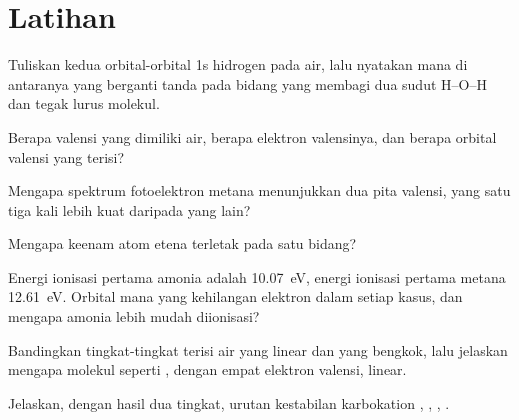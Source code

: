 \section{Latihan}

\begin{exercise}[$\star$]\label{exo:b2:fragment-orbitals:1}
Tuliskan kedua  orbital-orbital 1s hidrogen
pada air, lalu nyatakan mana di antaranya yang berganti tanda pada bidang
yang membagi dua sudut H--O--H dan tegak lurus molekul.
\end{exercise}

\begin{exercise}[$\star$]\label{exo:b2:fragment-orbitals:2}
Berapa  valensi yang dimiliki air, berapa elektron
valensinya, dan berapa orbital valensi yang terisi?
\end{exercise}

\begin{exercise}[$\star$]\label{exo:b2:fragment-orbitals:3}
Mengapa spektrum fotoelektron metana menunjukkan dua pita valensi, yang
satu tiga kali lebih kuat daripada yang lain?
\end{exercise}

\begin{exercise}[$\star$]\label{exo:b2:fragment-orbitals:4}
Mengapa keenam atom etena terletak pada satu bidang?
\end{exercise}

\begin{exercise}[$\star\star$]\label{exo:b2:fragment-orbitals:5}
Energi ionisasi pertama amonia adalah \qty{10.07}{eV}, energi ionisasi
pertama metana \qty{12.61}{eV}. Orbital mana yang kehilangan elektron dalam
setiap kasus, dan mengapa amonia lebih mudah diionisasi?
\end{exercise}

\begin{exercise}[$\star\star$]\label{exo:b2:fragment-orbitals:6}
Bandingkan tingkat-tingkat terisi air yang linear dan yang bengkok, lalu
jelaskan mengapa molekul seperti , dengan empat elektron valensi,
linear.
\end{exercise}

\begin{exercise}[$\star\star$]\label{exo:b2:fragment-orbitals:7}
Jelaskan, dengan hasil dua tingkat, urutan kestabilan karbokation
, , , .
\end{exercise}

